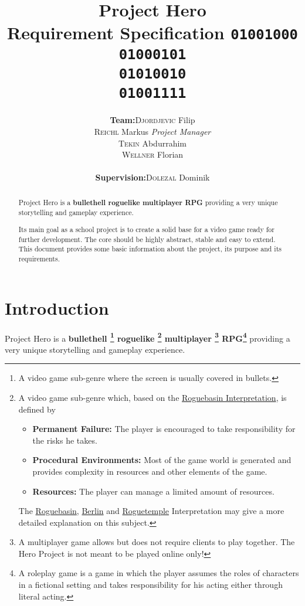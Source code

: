 \documentclass[11pt]{article}
\title{
  \textbf{Project Hero}\\
  \large{Requirement Specification}
  \linebreak
  \linebreak
  \small{\texttt{01001000\\01000101\\01010010\\01001111}}
}
\author{
  \begin{tabular}{rl}
    \textbf{Team:}
    & \textsc{Djordjevic} Filip\\
    & \textsc{Reichl} Markus \small{\textit{Project Manager}}\\
    & \textsc{Tekin} Abdurrahim\\
    & \textsc{Wellner} Florian\\
    \\
    \textbf{Supervision:}
    & \textsc{Dolezal} Dominik
  \end{tabular}
}
\begin{document}
\begin{titlepage}
  \clearpage
  \maketitle
  \thispagestyle{empty}
  
  \begin{abstract}
    \begin{flushleft}
      Project Hero is a \textbf{bullethell roguelike multiplayer RPG} providing a very unique storytelling and gameplay experience.
      
      Its main goal as a school project is to create a solid base for a video game ready for further development. The core should be highly abstract, stable and easy to extend.
      \linebreak
      \linebreak
      This document provides some basic information about the project, its purpose and its requirements.
     \end{flushleft}
  \end{abstract}
\end{titlepage}

\tableofcontents
\newpage

\section{Introduction}
Project Hero is a \textbf{
  bullethell
  \footnote{A video game sub-genre where the screen is usually covered in bullets.}
  roguelike
  \footnote{A video game sub-genre which, based on the \href{http://roguebasin.com/roguelike-definition}{Roguebasin Interpretation}, is defined by 
    \begin{itemize}
      \item \textbf{Permanent Failure:} The player is encouraged to take responsibility for the risks he takes.
      \item \textbf{Procedural Environments:} Most of the game world is generated and provides complexity in resources and other elements of the game.
      \item \textbf{Resources:} The player can manage a limited amount of resources.
    \end{itemize}
    The \href{http://roguebasin.com/roguelike-definition}{Roguebasin}, \href{http://roguebasin.com/index.php?title=Berlin_Interpretation}{Berlin} and \href{http://roguetemple.com/roguelike-definition}{Roguetemple} Interpretation may give a more detailed explanation on this subject.
  }
  multiplayer
  \footnote{A multiplayer game allows but does not require clients to play together. The Hero Project is not meant to be played online only!}
  RPG\footnote{A roleplay game is a game in which the player assumes the roles of characters in a fictional setting and takes responsibility for his acting either through literal acting.}
} providing a very unique storytelling and gameplay experience.
\end{document}
